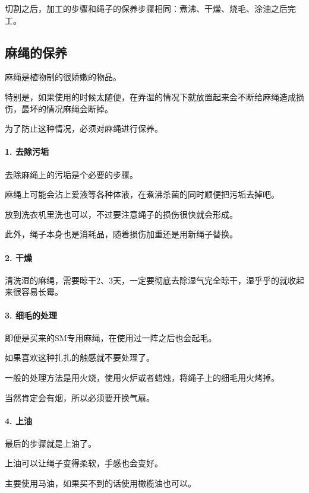 \documentclass[12pt,UTF8]{ctexbook}
\begin{document}
切割之后，加工的步骤和绳子的保养步骤相同：煮沸、干燥、烧毛、涂油之后完工。

\subsection{麻绳的保养}

麻绳是植物制的很娇嫩的物品。

特别是，如果使用的时候太随便，在弄湿的情况下就放置起来会不断给麻绳造成损伤，最坏的情况麻绳会断掉。

为了防止这种情况，必须对麻绳进行保养。

\paragraph{1. 去除污垢}

去除麻绳上的污垢是个必要的步骤。

麻绳上可能会沾上爱液等各种体液，在煮沸杀菌的同时顺便把污垢去掉吧。

放到洗衣机里洗也可以，不过要注意绳子的损伤很快就会形成。

此外，绳子本身也是消耗品，随着损伤加重还是用新绳子替换。

\paragraph{2. 干燥}

清洗湿的麻绳，需要晾干2、3天，一定要彻底去除湿气完全晾干，湿乎乎的就收起来很容易长霉。

\paragraph{3. 细毛的处理}

即便是买来的SM专用麻绳，在使用过一阵之后也会起毛。

如果喜欢这种扎扎的触感就不要处理了。

一般的处理方法是用火烧，使用火炉或者蜡烛，将绳子上的细毛用火烤掉。

当然肯定会有烟，所以必须要开换气扇。

\paragraph{4. 上油}

最后的步骤就是上油了。

上油可以让绳子变得柔软，手感也会变好。

主要使用马油，如果买不到的话使用橄榄油也可以。
\end{document}
